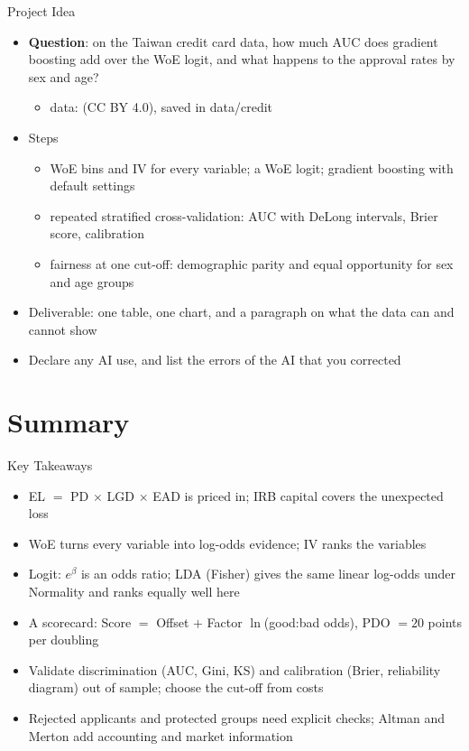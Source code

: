 \begin{frame}{Project Idea}
\itemsize{\small}
\begin{itemize}
    \item \textbf{Question}: on the Taiwan credit card data, how much AUC does gradient boosting add over the WoE logit, and what happens to the approval rates by sex and age?
    \begin{itemize}
        \item data:  (CC BY 4.0), saved in data/credit
    \end{itemize}
    \item Steps
    \begin{itemize}
        \item WoE bins and IV for every variable; a WoE logit; gradient boosting with default settings
        \item repeated stratified cross-validation: AUC with DeLong intervals, Brier score, calibration
        \item fairness at one cut-off: demographic parity and equal opportunity for sex and age groups
    \end{itemize}
    \item Deliverable: one table, one chart, and a paragraph on what the data can and cannot show
    \item Declare any AI use, and list the errors of the AI that you corrected
\end{itemize}
\end{frame}


\section{Summary}

\begin{frame}{Key Takeaways}
\itemsize{\small}
\begin{itemize}
    \item EL $=$ PD $\times$ LGD $\times$ EAD is priced in; IRB capital covers the unexpected loss
    \item WoE turns every variable into log-odds evidence; IV ranks the variables
    \item Logit: $e^{\beta}$ is an odds ratio; LDA (Fisher) gives the same linear log-odds under Normality and ranks equally well here
    \item A scorecard: Score $=$ Offset $+$ Factor $\ln$(good:bad odds), PDO $= 20$ points per doubling
    \item Validate discrimination (AUC, Gini, KS) and calibration (Brier, reliability diagram) out of sample; choose the cut-off from costs
    \item Rejected applicants and protected groups need explicit checks; Altman and Merton add accounting and market information
\end{itemize}
\end{frame}

